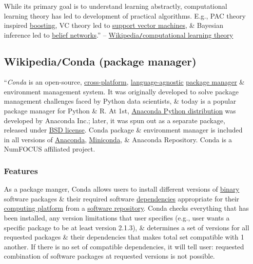 \documentclass{article}
\begin{document}
While its primary goal is to understand learning abstractly, computational learning theory has led to development of practical algorithms. E.g., PAC theory inspired \href{https://en.wikipedia.org/wiki/Boosting_(meta-algorithm)}{boosting}, VC theory led to \href{https://en.wikipedia.org/wiki/Support_vector_machine}{support vector machines}, \& Bayesian inference led to \href{https://en.wikipedia.org/wiki/Belief_networks}{belief networks}.'' -- \href{https://en.wikipedia.org/wiki/Computational_learning_theory}{Wikipedia{\tt/}computational learning theory}


\subsection{Wikipedia{\tt/}Conda (package manager)}
``{\it Conda} is an open-source, \href{https://en.wikipedia.org/wiki/Cross-platform}{cross-platform}, \href{https://en.wikipedia.org/wiki/Language-agnostic}{language-agnostic} \href{https://en.wikipedia.org/wiki/Package_manager}{package manager} \& environment management system. It was originally developed to solve package management challenges faced by Python data scientists, \& today is a popular package manager for Python \& R. At 1st, \href{https://en.wikipedia.org/wiki/Anaconda_(Python_distribution)}{Anaconda Python distribution} was developed by Anaconda Inc.; later, it was spun out as a separate package, released under \href{https://en.wikipedia.org/wiki/BSD_licenses}{BSD license}. Conda package \& environment manager is included in all versions of \href{https://en.wikipedia.org/wiki/Anaconda_(Python_distribution)}{Anaconda}, \href{https://en.wikipedia.org/wiki/Miniconda}{Miniconda}, \& Anaconda Repository. Conda is a NumFOCUS affiliated project.

\subsubsection{Features}
As a package manger, Conda allows users to install different versions of \href{https://en.wikipedia.org/wiki/Binary_file}{binary} software packages \& their required software \href{https://en.wikipedia.org/wiki/Coupling_(computer_programming)}{dependencies} appropriate for their \href{https://en.wikipedia.org/wiki/Computing_platform}{computing platform} from a \href{https://en.wikipedia.org/wiki/Software_repository}{software repository}. Conda checks everything that has been installed, any version limitations that user specifies (e.g., user wants a specific package to be at least version 2.1.3), \& determines a set of versions for all requested packages \& their dependencies that makes total set compatible with 1 another. If there is no set of compatible dependencies, it will tell user: requested combination of software packages at requested versions is not possible.
\end{document}
